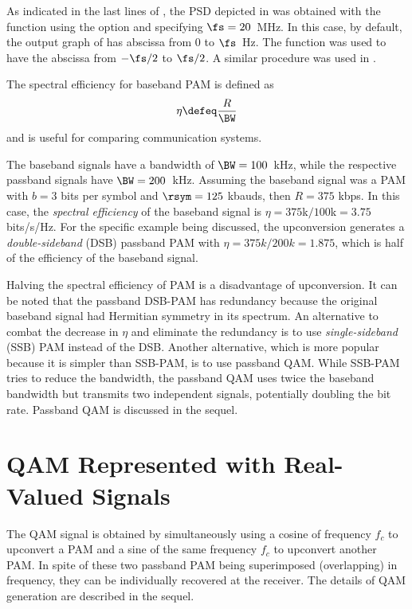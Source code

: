 As indicated in the last lines of , the PSD depicted in  was obtained with the  function using the  option and specifying $\fs=20$~MHz. In this case, by default, the output graph of  has abscissa from 0 to $\fs$~Hz. The  function was used to have the abscissa from $-\fs/2$ to $\fs/2$. A similar procedure was used in .

The spectral efficiency for baseband PAM is defined as
\begin{equation}
\eta \defeq \frac {R} {\BW}
\label{eq:spectral_efficiency}
\end{equation}
and is useful for comparing communication systems. 

The baseband signals have a bandwidth of $\BW=100$~kHz, while the respective passband signals have $\BW=200$~kHz. Assuming the baseband signal was a PAM with 
$b=3$ bits per symbol and $\rsym = 125$ kbauds, then $R=375$ kbps. In this case, the \emph{spectral efficiency} of the baseband signal is $\eta=375$k$/100$k$=3.75$ bits/s/Hz. For the specific example being discussed, the upconversion generates a \emph{double-sideband} (DSB) passband PAM with $\eta=375k/200k=1.875$, which is half of the efficiency of the baseband signal. 

Halving the spectral efficiency of PAM is a disadvantage of upconversion. It can be noted that the passband DSB-PAM has redundancy because the original baseband signal had Hermitian symmetry in its spectrum. An alternative to combat the decrease in $\eta$ and eliminate the redundancy is to use \emph{single-sideband} (SSB) PAM instead of the DSB. Another alternative, which is more popular because it is simpler than SSB-PAM, is to use passband QAM. While SSB-PAM tries to reduce the bandwidth, the passband QAM uses twice the baseband bandwidth but transmits two independent signals, potentially doubling the bit rate. Passband QAM is discussed in the sequel.

\section{QAM Represented with Real-Valued Signals}

The QAM signal is obtained by simultaneously using a cosine of frequency $f_c$ to upconvert a PAM and a sine of the same frequency $f_c$ to upconvert another PAM. In spite of these two passband PAM being superimposed (overlapping) in frequency, they can be individually recovered at the receiver.
The details of QAM generation are described in the sequel.

